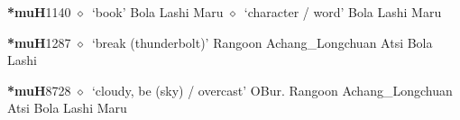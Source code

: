   \begin{list}{}{\leftmargin=1.5em \itemindent=-1.5em}
  \item {\footnotesize \textbf{*muH}}{\tiny 1140}
         $\diamond$~`book'
         Bola 
\hspace{1ex}
         Lashi 
\hspace{1ex}
         Maru 
\hspace{1ex}
         $\diamond$~`character / word'
         Bola 
\hspace{1ex}
         Lashi 
\hspace{1ex}
         Maru 
  \item {\footnotesize \textbf{*muH}}{\tiny 1287}
\hspace{1ex}
         $\diamond$~`break (thunderbolt)'
         Rangoon 
\hspace{1ex}
         Achang\_Longchuan 
\hspace{1ex}
         Atsi 
\hspace{1ex}
         Bola 
\hspace{1ex}
         Lashi 
  \item {\footnotesize \textbf{*muH}}{\tiny 8728}
\hspace{1ex}
         $\diamond$~`cloudy, be (sky) / overcast'
         OBur. 
\hspace{1ex}
         Rangoon 
\hspace{1ex}
         Achang\_Longchuan 
\hspace{1ex}
         Atsi 
\hspace{1ex}
         Bola 
\hspace{1ex}
         Lashi 
\hspace{1ex}
         Maru 
\hspace{1ex}

\end{list}
